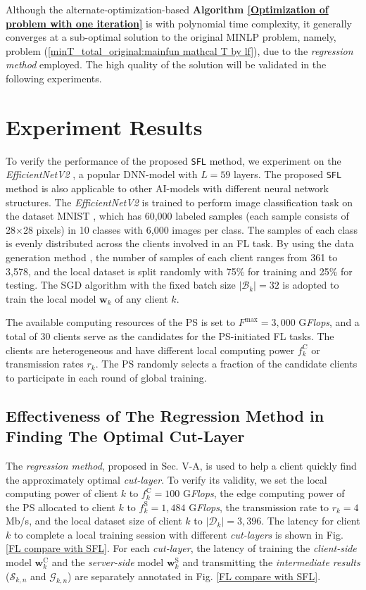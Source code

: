 \documentclass[10pt,journal,transmag]{IEEEtran}
\begin{document}
Although the alternate-optimization-based \textbf{Algorithm \ref{Optimization of problem with one iteration}} is with polynomial time complexity, it generally converges at a sub-optimal solution to the original MINLP problem, namely, problem (\ref{minT_total_original:mainfun mathcal T by lf}), due to the \textit{regression method} employed. The high quality of the solution will be validated in the following experiments.


\section{Experiment Results}
To verify the performance of the proposed \texttt{SFL} method, we experiment on the \textit{EfficientNetV2} \cite{tan2021efficientnetv2}, a popular DNN-model with $L=59$ layers. The proposed \texttt{SFL} method is also applicable to other AI-models with different neural network structures.
The \textit{EfficientNetV2} is trained to perform image classification task on the dataset MNIST \cite{deng2012mnist}, which has 60,000 labeled samples (each sample consists of 28$\times$28 pixels) in 10 classes with 6,000 images per class.
The samples of each class is evenly distributed across the clients involved in an FL task.
By using the data generation method \cite{9261995}, the number of samples of each client ranges from 361 to 3,578, and the local dataset is split randomly with 75\% for training and 25\% for testing.
The SGD algorithm with the fixed batch size $|\mathcal{B}_k|=32$ is adopted to train the local model $\textbf{w}_k$ of any client $k$.

The available computing resources of the PS is set to $F^\text{max}=3,000$ G\textit{Flops}, and a total of 30 clients serve as the candidates for the PS-initiated FL tasks. The clients are heterogeneous and have different local computing power $f_k^\text{C}$ or transmission rates $r_k$.
The PS randomly selects a fraction of the candidate clients to participate in each round of global training.

\subsection{Effectiveness of The Regression Method in Finding The Optimal Cut-Layer}
\label{chapter 5.A}
The \textit{regression method}, proposed in Sec. V-A, is used to help a client quickly find the approximately optimal \textit{cut-layer}.
To verify its validity, we set the local computing power of client $k$ to $f_k^\text{C}=100$ G\textit{Flops}, the edge computing power of the PS allocated to client $k$ to $f_k^\text{S}=1,484$ G\textit{Flops}, the transmission rate to $r_k=4$ Mb/s, and the local dataset size of client $k$ to $|\mathcal{D}_k|=3,396$.
The latency for client $k$ to complete a local training session with different \textit{cut-layers} is shown in Fig. \ref{FL compare with SFL}. For each \textit{cut-layer}, the latency of training the \textit{client-side} model $\textbf{w}^{\text{C}}_k$ and the \textit{server-side} model $\textbf{w}^{\text{S}}_k$ and transmitting the \textit{intermediate results} ($\mathcal{S}_{k,n}$ and $\mathcal{G}_{k,n}$) are separately annotated in Fig. \ref{FL compare with SFL}. 
\end{document}
